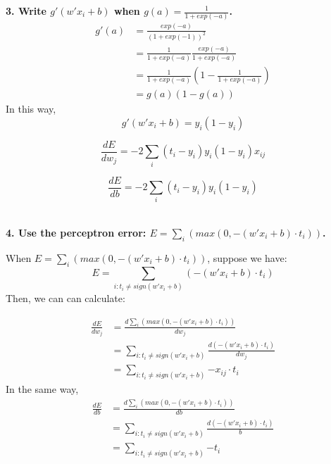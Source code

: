 \begin{description}
\item{\bf \large 3. Write $g'(w' x_i + b)$ when $g(a) = \frac{1}{1 + exp(-a)}$.}
\begin{equation}
\begin{split}
	g'(a) & = \frac{exp(-a)}{(1 + exp(-1))^2} \\
		  & = \frac{1}{1 + exp(-a)} \frac{exp(-a)}{1 + exp(-a)} \\
		  & = \frac{1}{1 + exp(-a)} (1 - \frac{1}{1 + exp(-a)}) \\
		  & = g(a) (1 - g(a))
\end{split}
\end{equation}
In this way,
\begin{equation}
	g'(w' x_i + b) = y_i (1 - y_i)
\end{equation}

\begin{equation}
	\frac{dE}{dw_j} = -2\sum_i{(t_i - y_i) y_i (1 - y_i) x_{ij}}
\end{equation}

\begin{equation}
	\frac{dE}{db} = -2\sum_i{(t_i - y_i) y_i (1 - y_i)}
\end{equation}\\

\item{\bf \large 4. Use the perceptron error: $E = \sum_i{(max(0, -(w' x_i + b) \cdot t_i))}$.}

When $E = \sum_i{(max(0, -(w' x_i + b) \cdot t_i))}$, suppose we have:
\begin{equation}
E = \sum_{i: t_i \neq sign(w' x_i + b)}{(-(w' x_i + b) \cdot t_i)}
\end{equation}
Then, we can can calculate:

\begin{equation}
\begin{split}
	\frac{dE}{dw_j} & = \frac{d\sum_i{(max(0, -(w' x_i + b) \cdot t_i))}}{dw_j} \\
					& = \sum_{i: t_i \neq sign(w' x_i + b)}{\frac{d(-(w' x_i + b) \cdot t_i)}{dw_j}} \\
					& = \sum_{i: t_i \neq sign(w' x_i + b)}{-x_{ij} \cdot t_i}
\end{split}
\end{equation}
In the same way, 
\begin{equation}
\begin{split}
	\frac{dE}{db} & = \frac{d \sum_i{(max(0, -(w' x_i + b) \cdot t_i))}}{db} \\
			      & = \sum_{i: t_i \neq sign(w' x_i + b)}{\frac{d(-(w' x_i + b) \cdot t_i)}{b}} \\
				  & = \sum_{i: t_i \neq sign(w' x_i + b)}{-t_i}
\end{split}
\end{equation}\\


\end{description}
